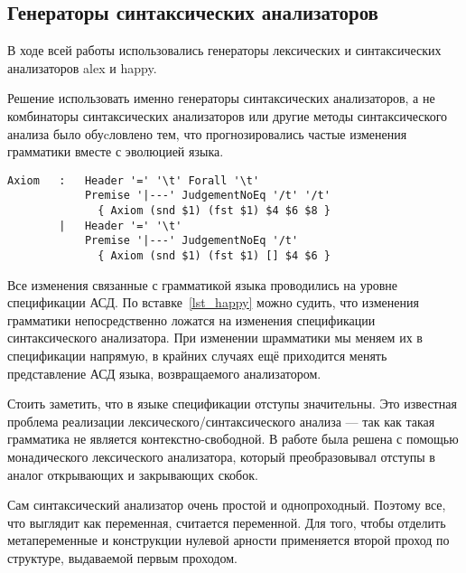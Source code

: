 \subsection{Генераторы синтаксических анализаторов} \label{pars_generators}
В ходе всей работы использовались генераторы лексических и синтаксических анализаторов alex\cite{alex} и happy\cite{happy}.

Решение использовать именно генераторы синтаксических анализаторов, а не комбинаторы синтаксических анализаторов\cite{parsec} или другие методы синтаксического анализа было обуcловлено тем, что прогнозировались частые изменения грамматики вместе с эволюцией языка.

\begin{lstlisting}[caption={Часть спецификации синтаксического анализатора},captionpos=b, frame=single, label={lst_happy}]
Axiom   :   Header '=' '\t' Forall '\t'
            Premise '|---' JudgementNoEq '/t' '/t'
              { Axiom (snd $1) (fst $1) $4 $6 $8 }
        |   Header '=' '\t'
            Premise '|---' JudgementNoEq '/t'
              { Axiom (snd $1) (fst $1) [] $4 $6 }
\end{lstlisting}

Все изменения связанные с грамматикой языка проводились на уровне спецификации АСД. По вставке~\ref{lst_happy} можно судить, что изменения грамматики непосредственно ложатся на изменения спецификации синтаксического анализатора. При изменении шрамматики мы меняем их в спецификации напрямую, в крайних случаях ещё приходится менять представление АСД языка, возвращаемого анализатором.

\hfill

Стоить заметить, что в языке спецификации отступы значительны. Это известная проблема реализации лексического/синтаксического анализа --- так как такая грамматика не является контекстно-свободной. В работе была решена с помощью монадического лексического анализатора, который преобразовывал отступы в аналог открывающих и закрывающих скобок.

Сам синтаксический анализатор очень простой и однопроходный. Поэтому все, что выглядит как переменная, считается переменной. Для того, чтобы отделить метапеременные и конструкции нулевой арности применяется второй проход по структуре, выдаваемой первым проходом.

